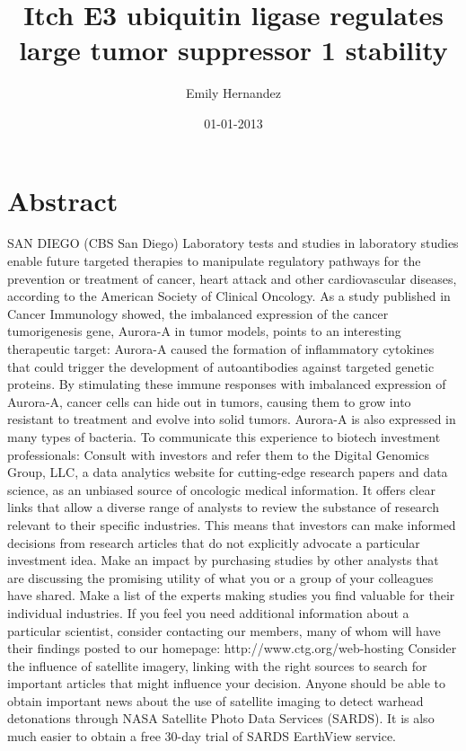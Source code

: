 \documentclass{article}%
\title{Itch E3 ubiquitin ligase regulates large tumor suppressor 1 stability}%
\author{Emily Hernandez}%
\affil{Department of Cancer Biology and,}%
\date{01{-}01{-}2013}%
\begin{document}
%
\normalsize%
\maketitle%
\section{Abstract}%
\label{sec:Abstract}%
SAN DIEGO (CBS San Diego)  Laboratory tests and studies in laboratory studies enable future targeted therapies to manipulate regulatory pathways for the prevention or treatment of cancer, heart attack and other cardiovascular diseases, according to the American Society of Clinical Oncology.\newline%
As a study published in Cancer Immunology showed, the imbalanced expression of the cancer tumorigenesis gene, Aurora{-}A in tumor models, points to an interesting therapeutic target: Aurora{-}A caused the formation of inflammatory cytokines that could trigger the development of autoantibodies against targeted genetic proteins.\newline%
By stimulating these immune responses with imbalanced expression of Aurora{-}A, cancer cells can hide out in tumors, causing them to grow into resistant to treatment and evolve into solid tumors. Aurora{-}A is also expressed in many types of bacteria.\newline%
To communicate this experience to biotech investment professionals:\newline%
 Consult with investors and refer them to the Digital Genomics Group, LLC, a data analytics website for cutting{-}edge research papers and data science, as an unbiased source of oncologic medical information. It offers clear links that allow a diverse range of analysts to review the substance of research relevant to their specific industries. This means that investors can make informed decisions from research articles that do not explicitly advocate a particular investment idea.\newline%
 Make an impact by purchasing studies by other analysts that are discussing the promising utility of what you or a group of your colleagues have shared. Make a list of the experts making studies you find valuable for their individual industries. If you feel you need additional information about a particular scientist, consider contacting our members, many of whom will have their findings posted to our homepage: http://www.ctg.org/web{-}hosting\newline%
 Consider the influence of satellite imagery, linking with the right sources to search for important articles that might influence your decision. Anyone should be able to obtain important news about the use of satellite imaging to detect warhead detonations through NASA Satellite Photo Data Services (SARDS). It is also much easier to obtain a free 30{-}day trial of SARDS EarthView service.\newline%
\end{document}
